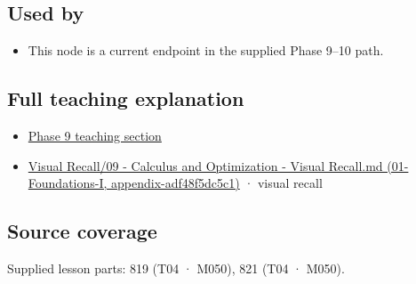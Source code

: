 \subsection{Used by}\label{appendix-e2d476574aab-used-by}

\begin{itemize}
\tightlist
\item
  This node is a current endpoint in the supplied Phase 9--10 path.
\end{itemize}

\subsection{Full teaching explanation}\label{appendix-e2d476574aab-full-teaching-explanation}

\begin{itemize}
\tightlist
\item
  \hyperref[02-foundations-ii-ch021-multivariable-derivatives-and-sensitivity-1]{Phase 9 teaching section}
\item
  \href{../01-Foundations-I/main.pdf\#nameddest=appendix-adf48f5dc5c1}{Visual Recall/09 - Calculus and Optimization - Visual Recall.md (01-Foundations-I, appendix-adf48f5dc5c1)} · visual recall
\end{itemize}

\subsection{Source coverage}\label{appendix-e2d476574aab-source-coverage}

Supplied lesson parts: 819 (T04 · M050), 821 (T04 · M050).
